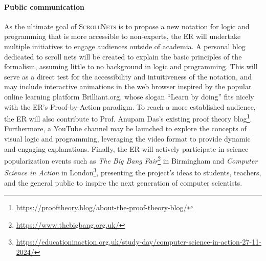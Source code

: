 \documentclass[12pt,draftproposal]{msca-pf}
\newcommand{\proj}{\small\textsc{ScrollNets}}
\begin{document}
\paragraph{Public communication}
As the ultimate goal of {\proj} is to propose a new notation for logic and programming that is more accessible to non-experts, the ER will undertake multiple initiatives to engage audiences outside of academia. A personal blog dedicated to scroll nets will be created to explain the basic principles of the formalism, assuming little to no background in logic and programming. This will serve as a direct test for the accessibility and intuitiveness of the notation, and may include interactive animations in the web browser inspired by the popular online learning platform Brilliant.org, whose slogan ``Learn by doing'' fits nicely with the ER's Proof-by-Action paradigm. To reach a more established audience, the ER will also contribute to Prof. Anupam Das's existing proof theory blog\footnote{\url{https://prooftheory.blog/about-the-proof-theory-blog/}}. Furthermore, a YouTube channel may be launched to explore the concepts of visual logic and programming, leveraging the video format to provide dynamic and engaging explanations. Finally, the ER will actively participate in science popularization events such as \emph{The Big Bang Fair}\footnote{\url{https://www.thebigbang.org.uk/}} in Birmingham and \emph{Computer Science in Action} in London\footnote{\url{https://educationinaction.org.uk/study-day/computer-science-in-action-27-11-2024/}}, presenting the project's ideas to students, teachers, and the general public to inspire the next generation of computer scientists.




\end{document}
